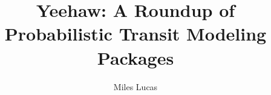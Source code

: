 \documentclass[RNAAS]{aastex631}
\begin{document}
\title{Yeehaw: A Roundup of Probabilistic Transit Modeling Packages}


\author[0000-0001-6341-310X]{Miles Lucas}


\keywords{}

\section{} 


\begin{figure}[h!]
    \centering
    \caption{}
    \label{fig:ror}
\end{figure}




{}

\end{document}
